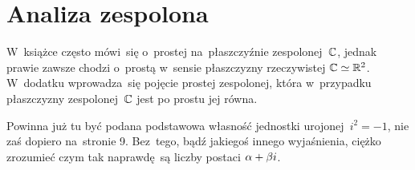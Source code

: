 \documentclass[a4paper,11pt]{article}
\begin{document}
\newpage
\section{Analiza zespolona}

\vspace{\spaceTwo}







\start W~książce często mówi~się o~prostej na~płaszczyźnie
zespolonej~$\mathbb{C}$, jednak prawie zawsze chodzi o~prostą w~sensie
płaszczyzny rzeczywistej $\mathbb{C} \simeq \mathbb{R}^{ 2 }$. W~dodatku wprowadza~się
pojęcie prostej zespolonej, która w~przypadku płaszczyzny
zespolonej~$\mathbb{C}$ jest po prostu jej równa.

\vspace{\spaceFour}


\start {} Powinna już tu być podana podstawowa własność jednostki
urojonej~$i^{ 2 } = -1$, nie zaś dopiero na~stronie 9. Bez~tego, bądź
jakiegoś innego wyjaśnienia, ciężko zrozumieć czym tak naprawdę~są
liczby postaci $\alpha + \beta i$.

\vspace{\spaceFour}
\end{document}
